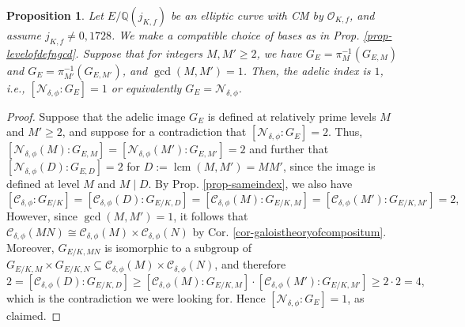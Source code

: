 \documentclass[11pt]{amsart}
\newtheorem{prop}[defn]{Proposition}
\theoremstyle{definition}
\newcommand{\Q}{\mathbb{Q}}
\newcommand{\Of}{\mathcal{O}_{K,f}}
\newcommand{\lcm}{\operatorname{lcm}}
\begin{document}
\begin{prop}\label{prop-gcdoneimpliesindex1}
    Let $E/\Q(j_{K,f})$ be an elliptic curve with CM by $\Of$, and assume $j_{K,f} \neq 0, 1728$. We make a compatible choice of bases as in Prop. \ref{prop-levelofdefngcd}. Suppose that for integers $M, M' \geq 2$, we have $G_{E} = \pi_{M}^{-1}(G_{E, M})$ and $G_{E} = \pi_{M'}^{-1}(G_{E, M'})$, and $\gcd(M,M')=1$. Then, the adelic index is $1$, i.e., $[\mathcal{N}_{\delta, \phi} : G_{E}]= 1$ or equivalently $G_E=\mathcal{N}_{\delta, \phi}$.
\end{prop}
\begin{proof}
    Suppose that the adelic image $G_E$ is defined at relatively prime levels $M$ and $M'\geq 2$, and suppose for a contradiction that $[\mathcal{N}_{\delta, \phi} : G_{E}]= 2$. Thus, $[\mathcal{N}_{\delta, \phi}(M) : G_{E, M}] = [\mathcal{N}_{\delta, \phi}(M') : G_{E, M'}] = 2$ and further that $[\mathcal{N}_{\delta, \phi}(D) : G_{E, D}] = 2$ for $D := \lcm(M, M')=MM'$, since the image is defined at level $M$ and $M\mid D$. By Prop. \ref{prop-sameindex}, we also have
    $$[\mathcal{C}_{\delta, \phi} : G_{E/K}] = [\mathcal{C}_{\delta, \phi}(D) : G_{E/K, D}]= [\mathcal{C}_{\delta, \phi}(M) : G_{E/K, M}] = [\mathcal{C}_{\delta, \phi}(M') : G_{E/K, M'}]= 2,$$
    However, since $\gcd(M,M')=1$, it follows that 
    $\mathcal{C}_{\delta, \phi}(MN)\cong \mathcal{C}_{\delta, \phi}(M)\times \mathcal{C}_{\delta, \phi}(N)$ by Cor. \ref{cor-galoistheoryofcompositum}. Moreover, $G_{E/K,MN}$ is isomorphic to a subgroup  of $ G_{E/K,M}\times G_{E/K,N} \subseteq \mathcal{C}_{\delta, \phi}(M)\times \mathcal{C}_{\delta, \phi}(N)$, and therefore
    $$2=[\mathcal{C}_{\delta, \phi}(D) : G_{E/K, D}]\geq [\mathcal{C}_{\delta, \phi}(M) : G_{E/K, M}] \cdot  [\mathcal{C}_{\delta, \phi}(M') : G_{E/K, M'}]\geq 2\cdot 2 = 4,$$
    which is the contradiction we were looking for. Hence $[\mathcal{N}_{\delta, \phi} : G_{E}]= 1$, as claimed.
\end{proof}
\end{document}
